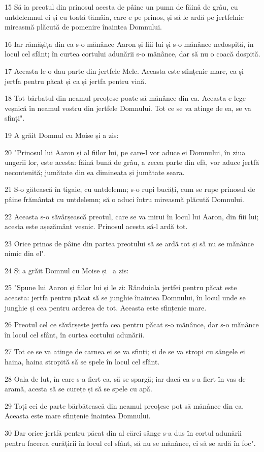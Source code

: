 \par 15 Să ia preotul din prinosul acesta de pâine un pumn de făină de grâu, cu untdelemnul ei și cu toată tămâia, care e pe prinos, și să le ardă pe jertfelnic mireasmă plăcută de pomenire înaintea Domnului.
\par 16 Iar rămășița din ea s-o mănânce Aaron și fiii lui și s-o mănânce nedospită, în locul cel sfânt; în curtea cortului adunării s-o mănânce, dar să nu o coacă dospită.
\par 17 Aceasta le-o dau parte din jertfele Mele. Aceasta este sfințenie mare, ca și jertfa pentru păcat și ca și jertfa pentru vină.
\par 18 Tot bărbatul din neamul preoțesc poate să mănânce din ea. Aceasta e lege veșnică în neamul vostru din jertfele Domnului. Tot ce se va atinge de ea, se va sfinți".
\par 19 A grăit Domnul cu Moise și a zis:
\par 20 "Prinosul lui Aaron și al fiilor lui, pe care-l vor aduce ei Domnului, în ziua ungerii lor, este acesta: făină bună de grâu, a zecea parte din efă, vor aduce jertfă necontenită; jumătate din ea dimineața și jumătate seara.
\par 21 S-o gătească în tigaie, cu untdelemn; s-o rupi bucăți, cum se rupe prinosul de pâine frământat cu untdelemn; să o aduci întru mireasmă plăcută Domnului.
\par 22 Aceasta s-o săvârșească preotul, care se va mirui în locul lui Aaron, din fiii lui; acesta este așezământ veșnic. Prinosul acesta să-l ardă tot.
\par 23 Orice prinos de pâine din partea preotului să se ardă tot și să nu se mănânce nimic din el".
\par 24 Și a grăit Domnul cu Moise și  a zis:
\par 25 "Spune lui Aaron și fiilor lui și le zi: Rânduiala jertfei pentru păcat este aceasta: jertfa pentru păcat să se junghie înaintea Domnului, în locul unde se junghie și cea pentru arderea de tot. Aceasta este sfințenie mare.
\par 26 Preotul cel ce săvârșește jertfa cea pentru păcat s-o mănânce, dar s-o mănânce în locul cel sfânt, în curtea cortului adunării.
\par 27 Tot ce se va atinge de carnea ei se va sfinți; și de se va stropi cu sângele ei haina, haina stropită să se spele în locul cel sfânt.
\par 28 Oala de lut, în care s-a fiert ea, să se spargă; iar dacă ea s-a fiert în vas de aramă, acesta să se curețe și să se spele cu apă.
\par 29 Toți cei de parte bărbătească din neamul preoțesc pot să mănânce din ea. Aceasta este mare sfințenie înaintea Domnului.
\par 30 Dar orice jertfă pentru păcat din al cărei sânge s-a dus în cortul adunării pentru facerea curățirii în locul cel sfânt, să nu se mănânce, ci să se ardă în foc".


